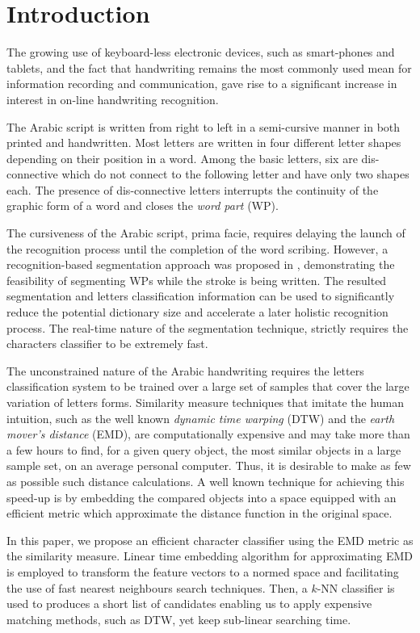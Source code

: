 \documentclass[10pt, conference, compsocconf]{IEEEtran}
\begin{document}
\section{Introduction}
The growing use of keyboard-less electronic devices, such as smart-phones and tablets, and the fact that handwriting remains the most commonly used mean for information recording and communication, gave rise to a significant increase in interest in on-line handwriting recognition.

The Arabic script is written from right to left in a semi-cursive manner in both printed and handwritten. 
Most letters are written in four different letter shapes depending on their position in a word.
Among the basic letters, six are dis-connective which do not connect to the following letter and have only two shapes each. 
The presence of dis-connective letters interrupts the continuity of the graphic form of a word and closes the \emph{word part} (WP).

The cursiveness of the Arabic script, prima facie, requires delaying the launch of the recognition process until the completion of the word scribing.
However, a recognition-based segmentation approach was proposed in \cite{kour2014real}, demonstrating the feasibility of segmenting WPs while the stroke is being written.
The resulted segmentation and letters classification information can be used to significantly reduce the potential dictionary size and accelerate a later holistic recognition process.
The real-time nature of the segmentation technique, strictly requires the characters classifier to be extremely fast.

The unconstrained nature of the Arabic handwriting requires the letters classification system to be trained over a large set of samples that cover the large variation of letters forms.
Similarity measure techniques that imitate the human intuition, such as the well known \emph{dynamic time warping} (DTW) and the \emph{earth mover's distance} (EMD), are computationally expensive and may take more than a few hours to find, for a given query object, the most similar objects in a large sample set, on an average personal computer.
Thus, it is desirable to make as few as possible such distance calculations.
A well known technique for achieving this speed-up is by embedding the compared objects into a space equipped with an efficient metric which approximate the distance function in the original space.

In this paper, we propose an efficient character classifier using the EMD metric as the similarity measure. 
Linear time embedding algorithm for approximating EMD \cite{shirdhonkar2008approximate} is employed to transform the feature vectors to a normed space and facilitating the use of fast nearest neighbours search techniques.
Then, a $k$-NN classifier is used to produces a short list of candidates enabling us to apply expensive matching methods, such as DTW, yet keep sub-linear searching time.
\end{document}
